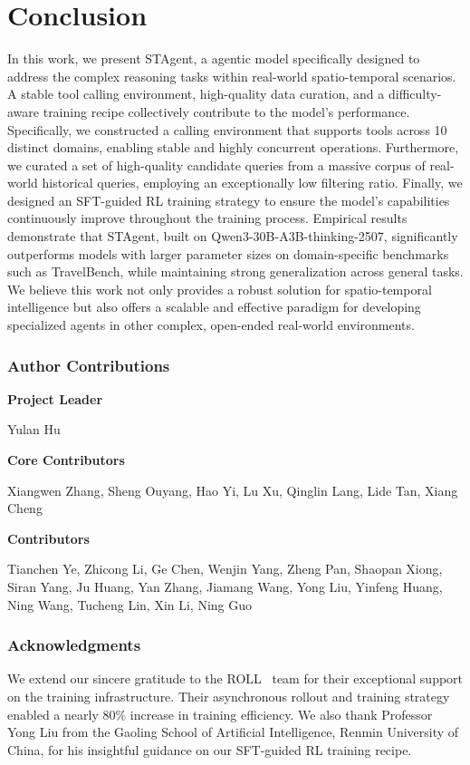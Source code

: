 \documentclass{article} %
\newcommand{\model}{STAgent\xspace}
\begin{document}
\section{Conclusion}
In this work, we present \model, a agentic model specifically designed to address the complex reasoning tasks within real-world spatio-temporal scenarios. A stable tool calling environment, high-quality data curation, and a difficulty-aware training recipe collectively contribute to the model's performance. Specifically, we constructed a calling environment that supports tools across 10 distinct domains, enabling stable and highly concurrent operations. Furthermore, we curated a set of high-quality candidate queries from a massive corpus of real-world historical queries, employing an exceptionally low filtering ratio. Finally, we designed an SFT-guided RL training strategy to ensure the model's capabilities continuously improve  throughout the training process. Empirical results demonstrate that \model, built on Qwen3-30B-A3B-thinking-2507, significantly outperforms models with larger parameter sizes on domain-specific benchmarks such as TravelBench, while maintaining strong generalization across general tasks. We believe this work not only provides a robust solution for spatio-temporal intelligence but also offers a scalable and effective paradigm for developing specialized agents in other complex, open-ended real-world environments.
\subsubsection*{Author Contributions}
\textbf{Project Leader}

Yulan Hu

\textbf{Core Contributors}

Xiangwen Zhang, Sheng Ouyang, Hao Yi, Lu Xu, Qinglin Lang, Lide Tan, Xiang Cheng

\textbf{Contributors}

Tianchen Ye, Zhicong Li, Ge Chen, Wenjin Yang, Zheng Pan, Shaopan Xiong, Siran Yang, Ju Huang, Yan Zhang, Jiamang Wang, Yong Liu, Yinfeng Huang, Ning Wang, Tucheng Lin, Xin Li, Ning Guo


\subsubsection*{Acknowledgments}
We extend our sincere gratitude to the ROLL~\cite{roll} team for their exceptional support on the training infrastructure. Their asynchronous rollout and training strategy enabled a nearly 80\% increase in training efficiency. We also thank Professor Yong Liu from the Gaoling School of Artificial Intelligence, Renmin University of China, for his insightful guidance on our SFT-guided RL training recipe.
\end{document}
